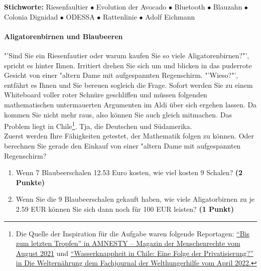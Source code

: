 \documentclass[a4paper, 9pt]{scrartcl}\usepackage[]{graphicx}\usepackage[]{xcolor}
\begin{document}
{\tiny\textbf{Stichworte:} Riesenfaultier $\bullet$ Evolution der Avocado $\bullet$ Bluetooth $ \bullet$ Blauzahn $\bullet$ Colonia Dignidad $\bullet$ ODESSA $\bullet$ Rattenlinie $\bullet$ Adolf Eichmann}


\paragraph{Aligatorenbirnen und Blaubeeren}



"'Sind Sie ein Riesenfautier oder warum kaufen Sie so viele
Aligatorenbirnen?"', spricht es hinter Ihnen. Irritiert drehen Sie sich um
und blicken in das puderrote Gesicht von einer {"a}ltern Dame mit aufgespannten Regenschirm. "'Wieso?"', entfährt es
Ihnen und Sie bereuen sogleich die Frage. Sofort werden Sie zu einem
Whiteboard voller roter Schnüre geschliffen und müssen folgenden
mathematischen untermauerten Argumenten im Aldi über sich ergehen
lassen. Da kommen Sie nicht mehr raus, also können Sie auch gleich
mitmachen. Das Problem liegt in Chile\footnote{Die Quelle der Inspiration
  für die Aufgabe waren folgende Reportagen:
  \href{https://www.amnesty.ch/de/ueber-amnesty/publikationen/magazin-amnesty/2021-3/bis-zum-letzten-tropfen}{"`Bis
  zum letzten Tropfen"' in AMNESTY – Magazin der Menschenrechte vom August
  2021} und
\href{https://www.welthungerhilfe.de/welternaehrung/rubriken/klima-ressourcen/wassernot-in-chile-eine-folge-der-privatisierung}{"`Wasserknappheit
  in Chile: Eine Folge der Privatisierung?"' in Die Welternährung dem
  Fachjournal der Welthungerhilfe vom April 2022.}}. Tja, die Deutschen und Südamerika.\\

Zuerst werden Ihre Fähigkeiten getestet, der Mathematik folgen zu können. Oder berechnen Sie gerade den Einkauf von einer {"a}ltern Dame mit aufgespannten Regenschirm?\\

\begin{enumerate}
\item Wenn 7 Blaubeerschalen 12.53 Euro kosten,  wie viel kosten 9 Schalen? \textbf{(2 Punkte)}
\item Wenn Sie die 9 Blaubeerschalen gekauft haben, wie viele Aligatorbirnen zu je 2.59 EUR können Sie sich dann noch für 100 EUR leisten? \textbf{(1 Punkt)}
\end{enumerate}
\end{document}
